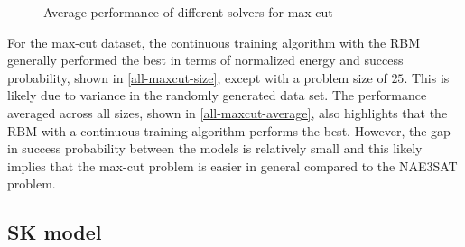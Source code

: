 \begin{figure}[!htbp]
    \hfill
    \caption{Average performance of different solvers for max-cut}
    \label{all-maxcut-average}
\end{figure}

For the max-cut dataset, the continuous training algorithm with the RBM generally performed the best in terms of normalized energy and success probability, shown in \autoref{all-maxcut-size}, except with a problem size of $25$. This is likely due to variance in the randomly generated data set. The performance averaged across all sizes, shown in \autoref{all-maxcut-average}, also highlights that the RBM with a continuous training algorithm performs the best. However, the gap in success probability between the models is relatively small and this likely implies that the max-cut problem is easier in general compared to the NAE3SAT problem.


\subsection{SK model}

